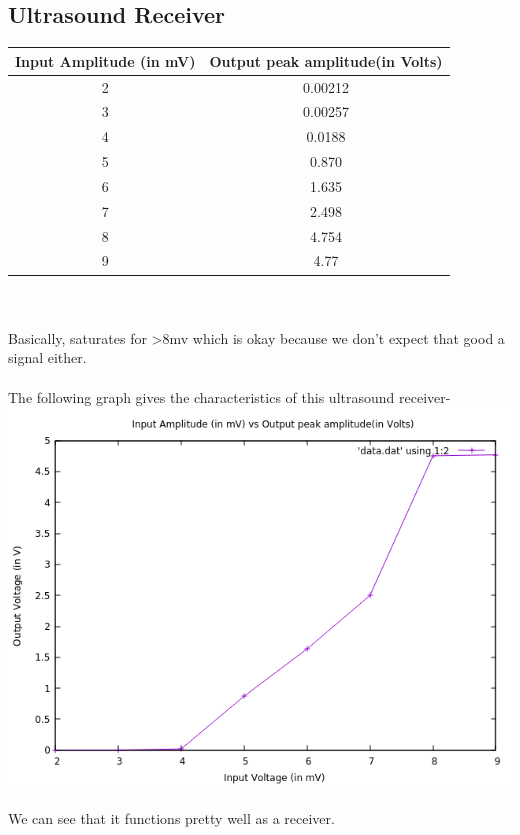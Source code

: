 \documentclass[12pt]{article}
\begin{document}
\subsection{Ultrasound Receiver}
\begin{tabular}{| c |c |} 


\hline 
Input Amplitude (in mV) & Output peak amplitude(in Volts) \\  
\hline  

2	&			0.00212	\\
3	&			0.00257	\\
4	&			0.0188\\
5	&			0.870	\\
6	&			1.635	\\
7	&			2.498	\\
8	&			4.754	\\
9	&			4.77	\\


\hline	%
\end{tabular}\\ \\
 Basically, saturates for >8mv which is okay because we don't expect that good a signal either.\\ \\
 The following graph gives the characteristics of this ultrasound receiver-\\
 \includegraphics[scale=0.6]{g.png} \\ \\ 
 We can see that it functions pretty well as a receiver.
\end{document}
